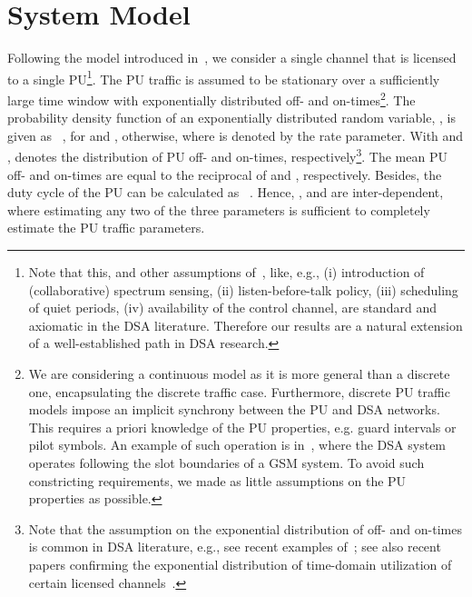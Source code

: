 \documentclass[11pt,draftclsnofoot,journal,onecolumn]{IEEEtran}
\begin{document}
\section{System Model}
\label{sec:System_Model}

Following the model introduced in~\cite{kim_tmc_2008}, we consider a single channel that is licensed to a single PU\footnote{Note that this, and other assumptions of~\cite{kim_tmc_2008}, like, e.g., (i) introduction of (collaborative) spectrum sensing, (ii) listen-before-talk policy, (iii) scheduling of quiet periods, (iv) availability of the control channel, are standard and axiomatic in the DSA literature. Therefore our results are a natural extension of a well-established path in DSA research.}. The PU traffic is assumed to be stationary over a sufficiently large time window with exponentially distributed off- and on-times\footnote{We are considering a continuous model as it is more general than a discrete one, encapsulating the discrete traffic case. Furthermore, discrete PU traffic models impose an implicit synchrony between the PU and DSA networks. This requires a priori knowledge of the PU properties, e.g. guard intervals or pilot symbols. An example of such operation is in~\cite{Papadimitratos_commag_2005}, where the DSA system operates following the slot boundaries of a GSM system. To avoid such constricting requirements, we made as little assumptions on the PU properties as possible.}. The probability density function of an exponentially distributed random variable, , is given as~\cite[Eq. (3.15)]{vanmieghem_book_2006} , for  and , otherwise, where  is denoted by the rate parameter. With  and ,  denotes the distribution of PU off- and on-times, respectively\footnote{Note that the assumption on the exponential distribution of off- and on-times is common in DSA literature, e.g., see recent examples of~\cite{li_jsac_2011,alshamrani_jsac_2011,zhang_jsac_2011}; see also recent papers confirming the exponential distribution of time-domain utilization of certain licensed channels~\cite{wellens_phycom_2009,chen_mobicom_2009,yin_tmcsub_2010}.}. The mean PU off- and on-times are equal to the reciprocal of  and , respectively. Besides, the duty cycle  of the PU can be calculated as~\cite[Sec. 11.3]{vanmieghem_book_2006} . Hence, ,  and  are inter-dependent, where estimating any two of the three parameters is sufficient to completely estimate the PU traffic parameters.
\end{document}
